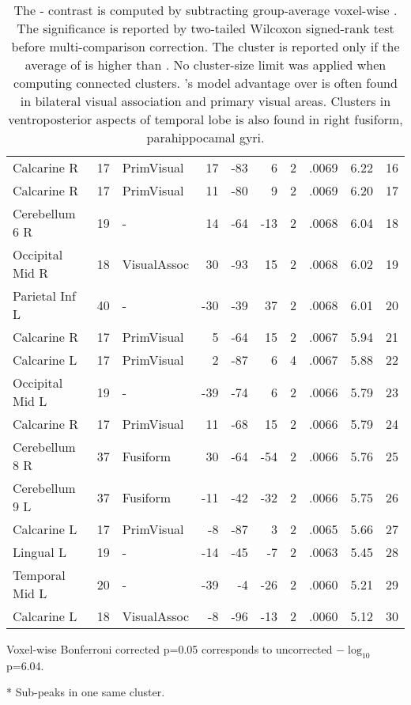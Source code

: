 \begin{table}
\begin{ThreePartTable}
\begin{tabularx}{\textwidth}{l l p{1.5cm} *{3}{r} *{2}{P{.8cm}} P{1.3cm} P{.5cm}}
Calcarine R & 17 & PrimVisual & 17 & -83 & 6 & 2 &  .0069  & 6.22 & 16 \\
Calcarine R & 17 & PrimVisual & 11 & -80 & 9 & 2 &  .0069  & 6.20 & 17 \\
Cerebellum 6 R & 19 & - & 14 & -64 & -13 & 2 &  .0068 & 6.04  & 18 \\
\midrule
Occipital Mid R & 18 & VisualAssoc & 30 & -93 & 15 & 2 &  .0068 & 6.02  & 19 \\
Parietal Inf L & 40 & - & -30 & -39 & 37 & 2 &  .0068 & 6.01 & 20 \\
Calcarine R & 17 & PrimVisual & 5 & -64 & 15 & 2 &  .0067& 5.94  & 21 \\
Calcarine L & 17 & PrimVisual & 2 & -87 & 6 & 4 &  .0067 & 5.88 & 22 \\
Occipital Mid L & 19 & - & -39 & -74 & 6 & 2 &  .0066 & 5.79 & 23 \\
Calcarine R & 17 & PrimVisual & 11 & -68 & 15 & 2 &  .0066 & 5.79 & 24 \\
Cerebellum 8 R & 37 & Fusiform & 30 & -64 & -54 & 2 &  .0066 & 5.76 & 25 \\
Cerebellum 9 L & 37 & Fusiform & -11 & -42 & -32 & 2 &  .0066 & 5.75& 26 \\
Calcarine L & 17 & PrimVisual & -8 & -87 & 3 & 2 &  .0065 & 5.66 & 27 \\
Lingual L & 19 & - & -14 & -45 & -7 & 2 &  .0063 & 5.45 & 28 \\
Temporal Mid L & 20 & - & -39 & -4 & -26 & 2 &  .0060 & 5.21 & 29 \\
Calcarine L & 18 & VisualAssoc & -8 & -96 & -13 & 2 &  .0060 & 5.12 & 30 \\
\bottomrule
    \end{tabularx}
    \begin{tablenotes}
        \footnotesize
        \item[] Voxel-wise Bonferroni corrected p=0.05 corresponds to uncorrected \(-\log_{10}\) p=6.04.
        \item[*] Sub-peaks in one same cluster. 
    \end{tablenotes}  
\end{ThreePartTable}
\caption[ Voxel Contrast, , Group]{The - contrast is computed by subtracting group-average voxel-wise . The significance is reported by two-tailed Wilcoxon signed-rank test before multi-comparison correction. The cluster is reported only if the average  of  is higher than . No cluster-size limit was applied when computing connected clusters. 's model advantage over  is often found in bilateral visual association and primary visual areas. Clusters in ventroposterior aspects of temporal lobe is also found in right fusiform, parahippocamal gyri. \label{tab:simasnContrastClusters_asn}}
\end{table}


